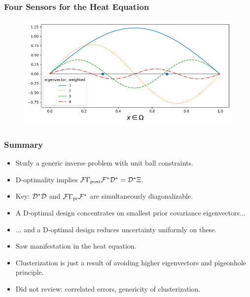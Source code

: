 \documentclass{beamer}
\begin{document}
\begin{frame}
  \frametitle{Four Sensors for the Heat Equation}
  \begin{figure}
    \centering
    \includegraphics[width=\textwidth]{eigenvectors_dst.png}
  \end{figure}
\end{frame}

\begin{frame}
  \frametitle{Summary}
  \begin{itemize}
  \item Study a generic inverse problem with unit ball constraints.
  \item D-optimality implies \(\mathcal{F} \Gamma_{\textup{post}}\mathcal{F}^* \mathcal{D}^* = \mathcal{D}^* \Xi\).
  \item Key: $\mathcal{D}^*\mathcal{D}$ and \(\mathcal{F} \Gamma_{\textup{pr}}\mathcal{F}^*\) are
    simultaneously diagonalizable.
  \item A D-optimal design concentrates on smallest prior covariance eigenvectors...
  \item ... and a D-optimal design reduces uncertainty uniformly on these.
  \item Saw manifestation in the heat equation.
  \item Clusterization is just a result of avoiding higher eigenvectors
    and pigeonhole principle.
  \item Did not review: correlated errors, genericity of clusterization.
  \end{itemize}
\end{frame}
\end{document}
